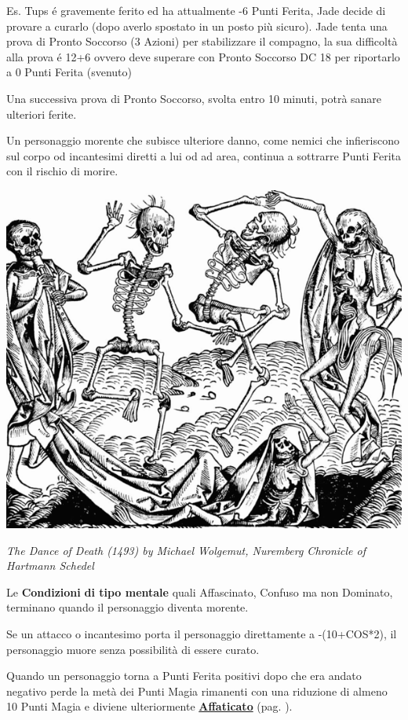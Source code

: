 \begin{multicols}{2}
\begin{giocatore}
Es. Tups é gravemente ferito ed ha attualmente -6 Punti Ferita, Jade decide di provare a curarlo (dopo averlo spostato in un posto più sicuro). Jade tenta una prova di Pronto Soccorso (3 Azioni) per stabilizzare il compagno, la sua difficoltà alla prova é 12+6 ovvero deve superare con Pronto Soccorso DC 18 per riportarlo a 0 Punti Ferita (svenuto)

Una successiva prova di Pronto Soccorso, svolta entro 10 minuti, potrà sanare ulteriori ferite.
\end{giocatore}

Un personaggio morente che subisce ulteriore danno, come nemici che infieriscono sul corpo od incantesimi diretti a lui od ad area, continua a sottrarre Punti Ferita con il rischio di morire.

\begin{center}
\includegraphics[width=0.8\linewidth]{immagini/Nuremberg_chronicles.png}

\emph{The Dance of Death (1493) by Michael Wolgemut, Nuremberg Chronicle of Hartmann Schedel}
\end{center}

\medskip

Le \textbf{Condizioni} \textbf{di tipo mentale} quali Affascinato, Confuso ma non Dominato, terminano quando il personaggio diventa morente.

Se un attacco o incantesimo porta il personaggio direttamente a -(10+COS*2), il personaggio muore senza possibilità di essere curato.

Quando un personaggio torna a Punti Ferita positivi dopo che era andato negativo perde la metà dei Punti Magia rimanenti con una riduzione di almeno 10 Punti Magia e diviene ulteriormente \hyperlink{affaticato}{\textbf{Affaticato}} (pag. \pageref{affaticato}).


\end{multicols}
